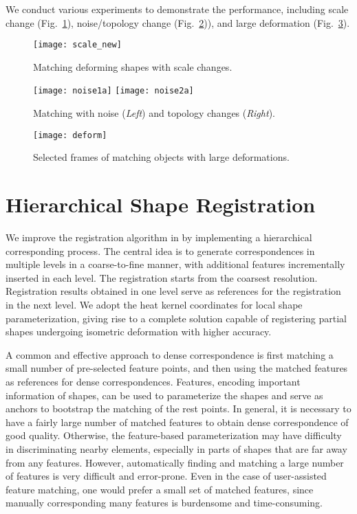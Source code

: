 We conduct various experiments to demonstrate the performance, including scale change
(Fig.~\ref{fig:scale}), noise/topology change (Fig.~\ref{fig:noise})), and
large deformation  (Fig.~\ref{fig:deform}).

\begin{figure}
\centering
\texttt{[image: scale\_new]}
\caption[Matching deforming shapes with scale changes.]
{Matching deforming shapes with scale changes.}
\label{fig:scale}
\end{figure}

\begin{figure}
\centering
\texttt{[image: noise1a]}
\texttt{[image: noise2a]}\\
\caption[Matching with noise and topology changes.]
{Matching with noise (\emph{Left}) and topology changes (\emph{Right}).}
\label{fig:noise}
\end{figure}

\begin{figure}
\centering
\texttt{[image: deform]}
\caption{Selected frames of matching objects with large deformations.}
\label{fig:deform}
\end{figure}


\section{Hierarchical Shape Registration}

We improve the registration algorithm in \cite{Hou:2011:TVCG} by implementing
a hierarchical corresponding process. The central idea is to generate correspondences
in multiple levels in a coarse-to-fine manner, with additional features incrementally
inserted in each level. The registration starts from the coarsest resolution. Registration
results obtained in one level serve as references for the registration in the next level.
We adopt the heat kernel coordinates for local shape parameterization, giving rise to a
complete solution capable of registering partial shapes undergoing isometric deformation
with higher accuracy.

A common and effective approach to dense correspondence is first matching a small number of pre-selected feature points, and then using the matched features as references for dense correspondences. Features, encoding important information of shapes, can be used to parameterize the shapes and serve as anchors to bootstrap the matching of the rest points. In general, it is necessary to have a fairly large number of matched features to obtain dense correspondence of good quality. Otherwise, the feature-based parameterization may have difficulty in discriminating nearby elements, especially in parts of shapes that are far away from any features. However, automatically finding and matching a large number of features is very difficult and error-prone. Even in the case of user-assisted feature matching, one would prefer a small set of matched features, since manually corresponding many features is burdensome and time-consuming.

